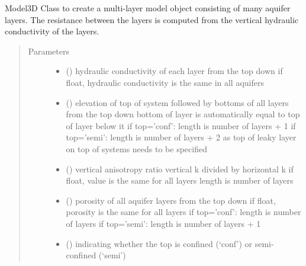 \documentclass[letterpaper,10pt,english]{sphinxmanual}
\begin{document}
\begin{fulllineitems}
\label{\detokenize{models/model3d:timml.model.Model3D}}
Model3D Class to create a multi-layer model object consisting of
many aquifer layers. The resistance between the layers is computed
from the vertical hydraulic conductivity of the layers.
\begin{quote}\begin{description}
\item[{Parameters}] \leavevmode\begin{itemize}
\item {} 
 (\sphinxstyleliteralemphasis{, }) \textendash{} hydraulic conductivity of each layer from the top down
if float, hydraulic conductivity is the same in all aquifers

\item {} 
 () \textendash{} elevation of top of system followed by bottoms of all layers
from the top down
bottom of layer is automatically equal to top of layer below it
if top=’conf’: length is number of layers + 1
if top=’semi’: length is number of layers + 2 as top
of leaky layer on top of systems needs to be specified

\item {} 
 () \textendash{} vertical anisotropy ratio vertical k divided by horizontal k
if float, value is the same for all layers
length is number of layers

\item {} 
 (\sphinxstyleliteralemphasis{, }) \textendash{} porosity of all aquifer layers from the top down
if float, porosity is the same for all layers
if top=’conf’: length is number of layers
if top=’semi’: length is number of layers + 1

\item {} 
 (\sphinxstyleliteralemphasis{, }\sphinxstyleliteralemphasis{ (}\sphinxstyleliteralemphasis{)}) \textendash{} indicating whether the top is confined (‘conf’) or
semi-confined (‘semi’)


\end{itemize}
\end{description}
\end{quote}
\end{fulllineitems}
\end{document}
